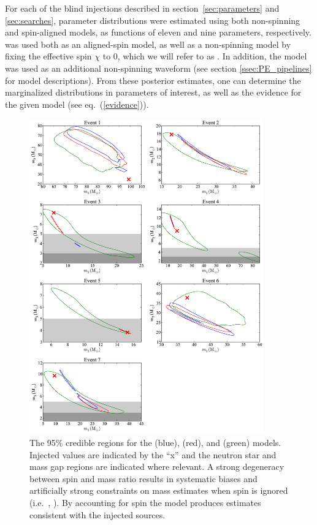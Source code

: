 For each of the blind injections described in section~\ref{sec:parameters} and 
\ref{sec:searches}, parameter distributions were estimated using both 
non-spinning and spin-aligned models, as functions of eleven and nine 
parameters, respectively.  \imr was used both
as an aligned-spin model, as well as a non-spinning model by fixing the
effective spin $\chi$ to 0, which we will refer to as \imrns.  In addition, the
\eob model was used as an additional non-spinning waveform (see
section \ref{ssec:PE_pipelines} for model descriptions).  From these posterior
estimates, one can determine the marginalized distributions in
parameters of interest, as well as the evidence for the given model
(see eq.~(\ref{evidence})).

\begin{figure}[t] 
  \includegraphics[width=0.9\textwidth]{papers/mdc2013_submission/figure6}
  \caption{\label{fig:PE_comp_mass} The 95\% credible regions for the \eob
      (blue), \imrns (red), and \imr (green) models.  Injected values are
      indicated by the ``x'' and the neutron star and mass gap regions are
      indicated where relevant.  A strong degeneracy between spin and mass
      ratio results in systematic biases and artificially strong constraints on
      mass estimates when spin is ignored (i.e.\ \eob, \imrns).  By accounting
      for spin the \imr model produces estimates consistent with the injected
      sources.}
\end{figure}

